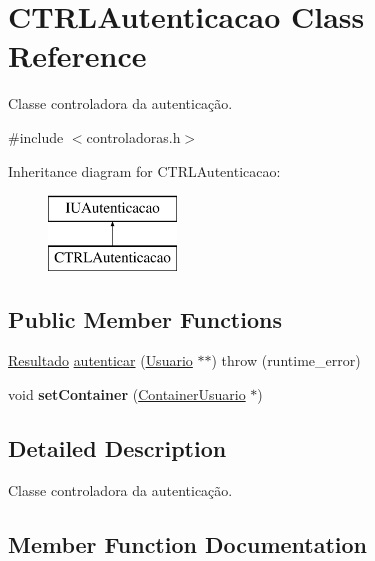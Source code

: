 \hypertarget{classCTRLAutenticacao}{}\section{C\+T\+R\+L\+Autenticacao Class Reference}
\label{classCTRLAutenticacao}


Classe controladora da autenticação.  




{\ttfamily \#include $<$controladoras.\+h$>$}

Inheritance diagram for C\+T\+R\+L\+Autenticacao\+:\begin{figure}[H]
\begin{center}
\leavevmode
\includegraphics[height=2.000000cm]{classCTRLAutenticacao}
\end{center}
\end{figure}
\subsection*{Public Member Functions}
\begin{DoxyCompactItemize}
\item 
\hyperlink{classResultado}{Resultado} \hyperlink{classCTRLAutenticacao_a46eea77a99f0050e402da12ccb4f5e98}{autenticar} (\hyperlink{classUsuario}{Usuario} $\ast$$\ast$)  throw (runtime\+\_\+error)
\item 
\mbox{\label{classCTRLAutenticacao_aab4ef3aab936745f7617ef2a15a2a8db}} 
void {\bfseries set\+Container} (\hyperlink{classContainerUsuario}{Container\+Usuario} $\ast$)
\end{DoxyCompactItemize}


\subsection{Detailed Description}
Classe controladora da autenticação. 

\subsection{Member Function Documentation}
\mbox{\label{classCTRLAutenticacao_a46eea77a99f0050e402da12ccb4f5e98}} 

